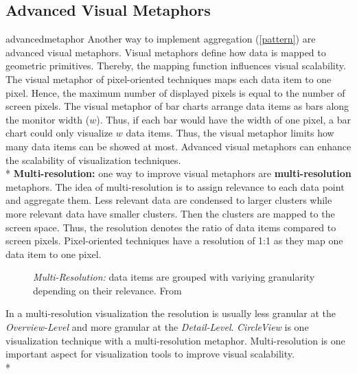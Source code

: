 \subsection{Advanced Visual Metaphors}{advancedmetaphor}
Another way to implement aggregation (\ref{pattern}) are advanced visual metaphors. Visual metaphors define how data is mapped to geometric primitives. Thereby, the mapping function influences visual scalability. The visual metaphor of pixel-oriented techniques maps each data item to one pixel. Hence, the maximum number of displayed pixels is equal to the number of screen pixels. The visual metaphor of bar charts  arrange data items as bars along the monitor width ($w$). Thus, if each bar would have the width of one pixel, a bar chart could only visualize  $w$ data items. Thus, the visual metaphor limits how many data items can be showed at most. Advanced visual metaphors can enhance the scalability of visualization techniques\cite{Eick2002}. \\*
 \textbf{Multi-resolution:} \label{multi-resolution} one way to improve visual metaphors are \textbf{multi-resolution} metaphors\cite{Keim2005}. The idea of multi-resolution is to assign relevance to each data point and aggregate them. Less relevant data are condensed to larger clusters while more relevant data have smaller clusters. Then the clusters are mapped to the screen space. Thus, the resolution denotes the ratio of data items compared to screen pixels. Pixel-oriented techniques have a resolution of 1:1 as they map one data item to one pixel. 
 \begin{figure}
     \centering
     \caption{\textit{Multi-Resolution: }data items are grouped with variying granularity depending on their relevance. From \cite{Keim2005}}
     \label{multi-resolution}
 \end{figure}
 In a multi-resolution visualization the resolution is usually less granular at the \textit{Overview-Level} and more granular at the \textit{Detail-Level}. \textit{CircleView} is one visualization technique with a multi-resolution metaphor. Multi-resolution is one important aspect for visualization tools to improve visual scalability.\\*
